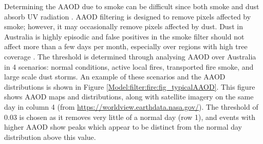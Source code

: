     
    
    
    
    
    Determining the AAOD due to smoke can be difficult since both smoke and dust absorb UV radiation \parencite{Ahn2008, Marais2012}.
    AAOD filtering is designed to remove pixels affected by smoke; however, it may occasionally remove pixels affected by dust.
    Dust in Australia is highly episodic and false positives in the smoke filter should not affect more than a few days per month, especially over regions with high tree coverage \parencite{Shao2007}.
    The threshold is determined through analysing AAOD over Australia in 4 scenarios: normal conditions, active local fires, transported fire smoke, and large scale dust storms.
    An example of these scenarios and the AAOD distributions is shown in Figure \ref{Model:filter:fire:fig_typicalAAOD}. 
    This figure shows AAOD maps and distributions, along with satellite imagery on the same day in column 4 (from \url{https://worldview.earthdata.nasa.gov/}).
    The threshold of 0.03 is chosen as it removes very little of a normal day (row 1), and events with higher AAOD show peaks which appear to be distinct from the normal day distribution above this value.
    
